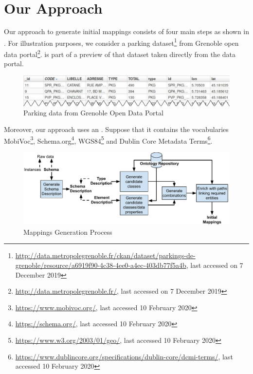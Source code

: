 \section{Our Approach}\label{sec:approach}
Our approach to generate initial mappings consists of four main steps as shown in . For illustration purposes, we consider a parking dataset\footnote{\url{http://data.metropolegrenoble.fr/ckan/dataset/parkings-de-grenoble/resource/a6919f90-4c38-4ee0-a4ec-403db77f5a4b}, last accessed on 7 December 2019} from Grenoble open data portal\footnote{\url{http://data.metropolegrenoble.fr/}, last accessed on 7 December 2019}.  is part of a preview of that dataset taken directly from the data portal.

\begin{figure}[h]
	\centering
	\includegraphics[scale=0.45]{images/sampleRawData.pdf}
	\caption{Parking data from Grenoble Open Data Portal}
	\label{fig:sampleRawData}
\end{figure}

Moreover, our approach uses an . Suppose that it contains the vocabularies MobiVoc\footnote{\url{https://www.mobivoc.org/}, last accessed 10 February 2020}, Schema.org\footnote{\url{https://schema.org/}, last accessed 10 February 2020}, WGS84\footnote{\url{https://www.w3.org/2003/01/geo/}, last accessed 10 February 2020} and Dublin Core Metadata Terms\footnote{\url{https://www.dublincore.org/specifications/dublin-core/dcmi-terms/}, last accessed 10 February 2020}. 

\begin{figure}
	\centering
	\includegraphics[scale=0.55]{images/GeneralApproachPaper1.pdf}
	\caption{Mappings Generation Process}
	\label{fig:overviewApproach}
\end{figure}


